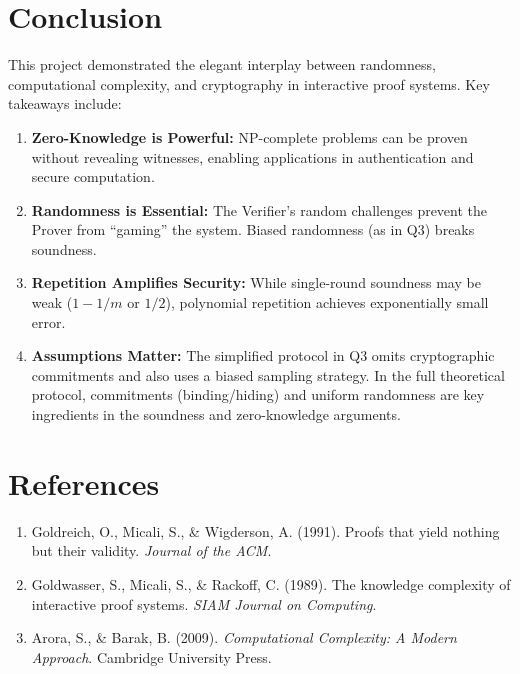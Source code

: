 \documentclass[11pt]{article}
\begin{document}
\section{Conclusion}

This project demonstrated the elegant interplay between randomness, computational complexity, and cryptography in interactive proof systems. Key takeaways include:

\begin{enumerate}
    \item \textbf{Zero-Knowledge is Powerful:} NP-complete problems can be proven without revealing witnesses, enabling applications in authentication and secure computation.
    
    \item \textbf{Randomness is Essential:} The Verifier's random challenges prevent the Prover from ``gaming'' the system. Biased randomness (as in Q3) breaks soundness.
    
    \item \textbf{Repetition Amplifies Security:} While single-round soundness may be weak ($1 - 1/m$ or $1/2$), polynomial repetition achieves exponentially small error.
    
    \item \textbf{Assumptions Matter:} The simplified protocol in Q3 omits cryptographic commitments and also uses a biased sampling strategy. In the full theoretical protocol, commitments (binding/hiding) and uniform randomness are key ingredients in the soundness and zero-knowledge arguments.
\end{enumerate}

\section*{References}
\begin{enumerate}
    \item Goldreich, O., Micali, S., \& Wigderson, A. (1991). Proofs that yield nothing but their validity. \textit{Journal of the ACM}.
    \item Goldwasser, S., Micali, S., \& Rackoff, C. (1989). The knowledge complexity of interactive proof systems. \textit{SIAM Journal on Computing}.
    \item Arora, S., \& Barak, B. (2009). \textit{Computational Complexity: A Modern Approach}. Cambridge University Press.
\end{enumerate}
\end{document}
